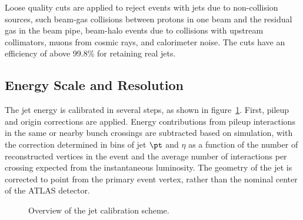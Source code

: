 Loose quality cuts are applied to reject events with jets due to non-collision sources, such beam-gas collisions between protons in one beam and the residual gas in the beam pipe, beam-halo events due to collisions with upstream collimators, muons from cosmic rays, and calorimeter noise. The cuts have an efficiency of above 99.8\% for retaining real jets. 


\subsection{Energy Scale and Resolution}\label{sec:reco-jets-energy-scale-resolution}
The jet energy is calibrated in several steps, as shown in figure~\ref{fig:reco-jet-calibration-flowchart}. First, pileup and origin corrections are applied. Energy contributions from pileup interactions in the same or nearby bunch crossings are subtracted based on simulation, with the correction determined in bins of jet $\pt$ and $\eta$ as a function of the number of reconstructed vertices in the event and the average number of interactions per crossing expected from the instantaneous luminosity. 
The geometry of the jet is corrected to point from the primary event vertex, rather than the nominal center of the ATLAS detector. 

\begin{figure}[htbp]
	\centering
	\caption{Overview of the jet calibration scheme. }
	\label{fig:reco-jet-calibration-flowchart}
\end{figure}


